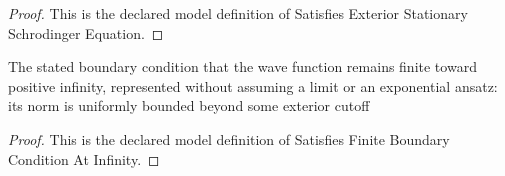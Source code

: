 \begin{proof}
  This is the declared model definition of Satisfies Exterior Stationary Schrodinger Equation.
\end{proof}
\begin{definition}
  \label{def:physics:phyx-mini-0617:phyxminiproblems-problemphyxmini0617-satisfiesfiniteboundaryconditionatinfinity}
  The stated boundary condition that the wave function remains finite toward positive infinity, represented without assuming a limit or an exponential ansatz: its norm is uniformly bounded beyond some exterior cutoff
\end{definition}
\begin{proof}
  This is the declared model definition of Satisfies Finite Boundary Condition At Infinity.
\end{proof}
